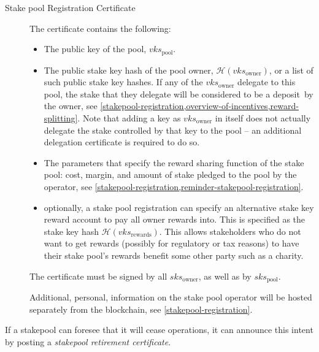 \documentclass[11pt,a4paper]{article}
\begin{document}
\begin{description}
\item[Stake pool Registration Certificate]
The certificate contains the following:

\begin{itemize}
\item
  The public key of the pool, \(vks_\text{pool}\).
\item The public stake key hash of the pool owner,
  \(\mathcal{H}(vks_\text{owner})\),
  or a list of such public stake key hashes. If any of the
  \(vks_\text{owner}\)
  delegate to this pool, the stake that they delegate will be
  considered to be a deposit~by the owner, see
  \cref{stakepool-registration,overview-of-incentives,reward-splitting}. Note
  that adding a key as \(vks_\text{owner}\)
  in itself does not actually delegate the stake controlled by that
  key to the pool -- an additional delegation certificate is required
  to do so.
\item
  The parameters that specify the reward sharing function of the stake
  pool: cost, margin, and amount of stake pledged to the pool by the
  operator, see \cref{stakepool-registration,reminder-stakepool-registration}.
\item
  optionally, a stake pool registration can specify an alternative stake
  key reward account to pay all owner rewards into. This is specified as
  the stake key hash \(\mathcal{H}(vks_\text{rewards})\). This allows
  stakeholders who do not want to get rewards (possibly for regulatory
  or tax reasons) to have their stake pool's rewards benefit some other
  party such as a charity.
\end{itemize}

The certificate must be signed by all \(sks_\text{owner}\), as well as
by \(sks_\text{pool}\).

Additional, personal, information on the stake pool operator will be
hosted separately from the blockchain, see \cref{stakepool-registration}.
\end{description}

If a stakepool can foresee that it will cease operations, it can
announce this intent by posting a \emph{stakepool retirement
certificate}.
\end{document}

